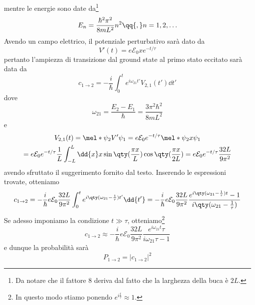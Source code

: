 \begin{soluzione}
   mentre le energie sono date da\footnote{Da notare che il fattore $8$ deriva dal fatto che la larghezza della buca è $2L$.}
   \begin{equation*}
      E_n
      =\frac{\hbar^2 \pi^2}{8 m L^2} n^2
      \qq{,}
      n=1,2,\ldots
   \end{equation*}
   Avendo un campo elettrico, il potenziale perturbativo sarà dato da
   \begin{equation*}
      V'(t)
      =e \mathcal{E}_0 x e^{-t/\tau}
   \end{equation*}
   pertanto l'ampiezza di transizione dal ground state al primo stato eccitato sarà data da
   \begin{equation*}
      c_{1 \to 2}
      =-\frac{i}{\hbar} \int_{0}^{t} e^{i \omega_{21} t'} V_{2,1}(t') \dd{t'}
   \end{equation*}
   dove
   \begin{equation*}
      \omega_{21}
      =\frac{E_2 - E_1}{\hbar}
      =\frac{3 \pi^2 \hbar^2}{8 m L^2}
   \end{equation*}
   e
   \begin{gather*}
      V_{2,1}(t)
      =\mel*{\psi_2}{V'}{\psi_1}
      =e \mathcal{E}_0 e^{-t/\tau} \mel*{\psi_2}{x}{\psi_1}
      \\
      =e \mathcal{E}_0 e^{-t/\tau} \frac{1}{L} \int_{-L}^{L} \dd{x} x \sin{ \qty( \frac{\pi x}{L} ) } \cos{ \qty( \frac{\pi x}{2L} ) }
      =e \mathcal{E}_0 e^{-t/\tau} \frac{32 L}{9 \pi^2}
   \end{gather*}
   avendo sfruttato il suggerimento fornito dal testo. Inserendo le espressioni trovate, otteniamo
   \begin{equation*}
      c_{1 \to 2}
      =-\frac{i}{\hbar} e \mathcal{E}_0 \frac{32 L}{9 \pi^2} \int_{0}^{t} e^{i \qty( \omega_{21} - \frac{1}{\tau}) t'} \dd{t'}
      =-\frac{i}{\hbar} e \mathcal{E}_0 \frac{32 L}{9 \pi^2} \frac{e^{i \qty( \omega_{21} - \frac{1}{\tau}) t} - 1}{i \qty( \omega_{21} - \frac{1}{\tau})}
   \end{equation*}
   Se adesso imponiamo la condizione $t \gg \tau$, otteniamo\footnote{In questo modo stiamo ponendo $e^{i \frac{t}{\tau}}\approx 1$.}
   \begin{equation*}
      c_{1 \to 2}
      \approx -\frac{i}{\hbar} e \mathcal{E}_0 \frac{32 L}{9 \pi^2} \frac{e^{i \omega_{21} t} \tau}{i \omega_{21} \tau - 1}
   \end{equation*}
   e dunque la probabilità sarà
   \begin{equation*}
      P_{1 \to 2}
      =|c_{1 \to 2}|^2

\end{equation*}
\end{soluzione}
